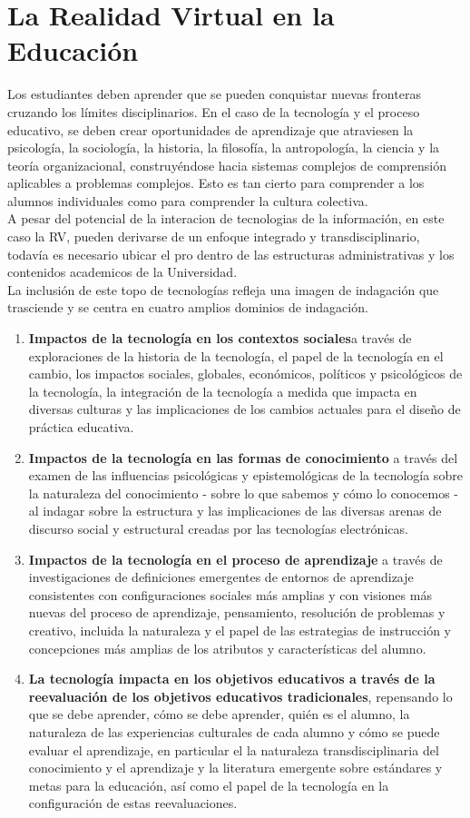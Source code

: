 \section{La Realidad Virtual en la Educaci\'on}
Los estudiantes deben aprender que se pueden conquistar nuevas fronteras cruzando los límites disciplinarios. En el caso de la tecnología y el proceso educativo, 
se deben crear oportunidades de aprendizaje que atraviesen la psicología, la sociología, la historia, la filosofía, la antropología, la ciencia y la teoría organizacional, 
construyéndose hacia sistemas complejos de comprensión aplicables a problemas complejos. Esto es tan cierto para comprender a los alumnos individuales como para comprender 
la cultura colectiva.\\
A pesar del potencial de la interacion de tecnologias de la información, en este caso la RV, pueden derivarse de un enfoque integrado y transdisciplinario, 
todavía es necesario ubicar el pro dentro de las estructuras administrativas y los contenidos academicos de la Universidad.\\ 
La inclusión de este topo de tecnologías refleja una imagen de indagación que trasciende y se centra en cuatro amplios dominios de indagación.\cite{norton1994integrating}
\begin{enumerate}
	\item \textbf{Impactos de la tecnología en los contextos sociales}a través de exploraciones de la historia de la tecnología, el papel de la tecnología en el cambio, los impactos sociales, globales, económicos, políticos y psicológicos de la tecnología, la integración de la tecnología a medida que impacta en diversas culturas y las implicaciones de los cambios actuales para el diseño de práctica educativa.
	\item \textbf{Impactos de la tecnología en las formas de conocimiento} a través del examen de las influencias psicológicas y epistemológicas de la tecnología sobre la naturaleza del conocimiento - sobre lo que sabemos y cómo lo conocemos - al indagar sobre la estructura y las implicaciones de las diversas arenas de discurso social y estructural creadas por las tecnologías electrónicas.
	\item \textbf{Impactos de la tecnología en el proceso de aprendizaje} a través de investigaciones de definiciones emergentes de entornos de aprendizaje consistentes con configuraciones sociales más amplias y con visiones más nuevas del proceso de aprendizaje, pensamiento, resolución de problemas y creativo, incluida la naturaleza y el papel de las estrategias de instrucción y concepciones más amplias de los atributos y características del alumno.
	\item \textbf{La tecnología impacta en los objetivos educativos a través de la reevaluación de los objetivos educativos tradicionales}, repensando lo que se debe aprender, cómo se debe aprender, quién es el alumno, la naturaleza de las experiencias culturales de cada alumno y cómo se puede evaluar el aprendizaje, en particular el la naturaleza transdisciplinaria del conocimiento y el aprendizaje y la literatura emergente sobre estándares y metas para la educación, así como el papel de la tecnología en la configuración de estas reevaluaciones.
\end{enumerate}

